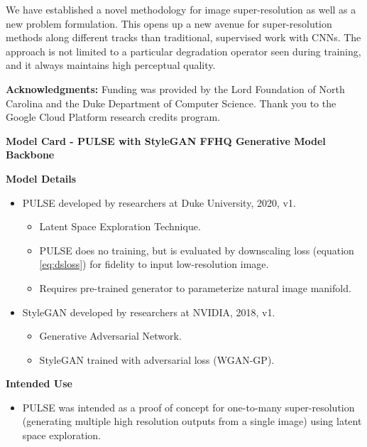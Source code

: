 \documentclass[10pt,twocolumn,letterpaper]{article}
\begin{document}
We have established a novel methodology for image super-resolution as well as a new problem formulation. This opens up a new avenue for super-resolution methods along different tracks than traditional, supervised work with CNNs. The approach is not limited to a particular degradation operator seen during training, and it always maintains high perceptual quality. 


\vspace*{5pt}
\noindent\textbf{Acknowledgments:}
Funding was provided by the Lord Foundation of North Carolina and the Duke Department of Computer Science. Thank you to the Google Cloud Platform research credits program.


{


}

\pagebreak

\begin{figure*}[ht]  \label{fig:modelcard} 
\begin{tcolorbox}[
    sharp corners,
    colback=white,
    colframe=black
    ]
\begin{center}
\Large\textbf{Model Card - PULSE with StyleGAN FFHQ Generative Model Backbone} \\
\end{center}
\small
\textbf{Model Details}
\begin{itemize}
    \item PULSE developed by researchers at Duke University, 2020, v1.
    \begin{itemize}
        \item Latent Space Exploration Technique.
        \item PULSE does no training, but is evaluated by downscaling loss (equation \ref{eq:dsloss}) for fidelity to input low-resolution image.
        \item Requires pre-trained generator to parameterize natural image manifold.
    \end{itemize}
    \item StyleGAN developed by researchers at NVIDIA, 2018, v1.
    \begin{itemize}
        \item Generative Adversarial Network.
        \item StyleGAN trained with adversarial loss (WGAN-GP).
    \end{itemize}
\end{itemize}
\textbf{Intended Use}
\begin{itemize}
    \item PULSE was intended as a proof of concept for one-to-many super-resolution (generating multiple high resolution outputs from a single image) using latent space exploration.

\end{itemize}
\end{tcolorbox}
\end{figure*}
\end{document}
